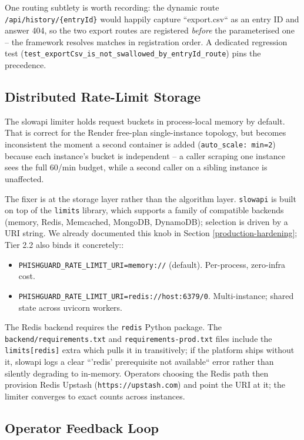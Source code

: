 One routing subtlety is worth recording: the dynamic route
\texttt{/api/history/\{entryId\}} would happily capture
``export.csv`` as an entry ID and answer 404, so the two export
routes are registered \emph{before} the parameterised one -- the
framework resolves matches in registration order.  A dedicated
regression test (\texttt{test\_exportCsv\_is\_not\_swallowed\_by\_entryId\_route})
pins the precedence.

\subsection{Distributed Rate-Limit Storage}

The slowapi limiter holds request buckets in process-local memory by default. That is correct for the Render free-plan single-instance topology, but becomes inconsistent the moment a second container is added (\texttt{auto\_scale: min=2}) because each instance's bucket is independent -- a caller scraping one instance sees the full 60/min budget, while a second caller on a sibling instance is unaffected.

The fixer is at the storage layer rather than the algorithm layer. \texttt{slowapi} is built on top of the \texttt{limits} library, which supports a family of compatible backends (memory, Redis, Memcached, MongoDB, DynamoDB); selection is driven by a URI string. We already documented this knob in Section \ref{production-hardening}; Tier 2.2 also binds it concretely::

\begin{itemize}
\item
  \texttt{PHISHGUARD\_RATE\_LIMIT\_URI=memory://} (default).  Per-process, zero-infra cost.
\item
  \texttt{PHISHGUARD\_RATE\_LIMIT\_URI=redis://host:6379/0}.  Multi-instance; shared state across uvicorn workers.
\end{itemize}

The Redis backend requires the \texttt{redis} Python package. The \texttt{backend/requirements.txt} and \texttt{requirements-prod.txt} files include the \texttt{limits[redis]} extra which pulls it in transitively; if the platform ships without it, slowapi logs a clear ``'redis' prerequisite not available`` error rather than silently degrading to in-memory. Operators choosing the Redis path then provision Redis Upstash (\verb|https://upstash.com|) and point the URI at it; the limiter converges to exact counts across instances.

\subsection{Operator Feedback Loop}

